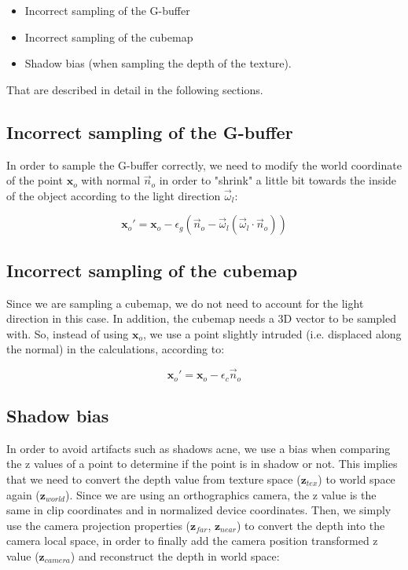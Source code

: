 \begin{itemize}
	\item Incorrect sampling of the G-buffer
	\item Incorrect sampling of the cubemap
	\item Shadow bias (when sampling the depth of the texture).
\end{itemize}

That are described in detail in the following sections.

\subsection{Incorrect sampling of the G-buffer}

In order to sample the G-buffer correctly, we need to modify the world coordinate of the point $\mathbf{x}_o$ with normal $\vec{n}_o$ in order to "shrink" a little bit towards the inside of the object according to the light direction $\vec{\omega}_l$:

$$
\mathbf{x}_o' = \mathbf{x}_o - \epsilon_g (\vec{n}_o - \vec{\omega}_l ( \vec{\omega}_l \cdot  \vec{n}_o))
$$

\subsection{Incorrect sampling of the cubemap}

Since we are sampling a cubemap, we do not need to account for the light direction in this case. In addition, the cubemap needs a 3D vector to be sampled with. So, instead of using $\mathbf{x}_o$, we use a point slightly intruded (i.e. displaced along the normal) in the calculations, according to:

$$
\mathbf{x}_o' = \mathbf{x}_o - \epsilon_c \vec{n}_o
$$

\subsection{Shadow bias}

In order to avoid artifacts such as shadows acne, we use a bias when comparing the z values of a point to determine if the point is in shadow or not. This implies that we need to convert the depth value from texture space ($\mathbf{z}_{tex}$) to world space again ($\mathbf{z}_{world}$). Since we are using an orthographics camera, the z value is the same in clip coordinates and in normalized device coordinates. Then, we simply use the camera projection properties ($\mathbf{z}_{far}$, $\mathbf{z}_{near}$) to convert the depth into the camera local space, in order to finally add the camera position transformed z value ($\mathbf{z}_{camera}$) and reconstruct the depth in world space:


